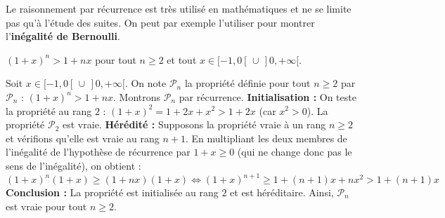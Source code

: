 	\begin{nosummary}
		Le raisonnement par récurrence est très utilisé en mathématiques et ne se limite pas qu'à l'étude des suites. On peut par exemple l'utiliser pour montrer l'\textbf{inégalité de Bernoulli}.

		\begin{formula}
			$(1 + x)^n > 1 + nx$ pour tout $n \geq 2$ et tout $x \in [-1, 0[ \, \cup \, ]0, +\infty[$.
		\end{formula}

		\begin{demonstration}
			Soit $x \in [-1, 0[ \, \cup \, ]0, +\infty[$. On note $\mathcal{P}_n$ la propriété définie pour tout $n \geq 2$ par $\mathcal{P}_n$ : $(1+x)^n > 1+nx$. Montrons $\mathcal{P}_n$ par récurrence.
			\newpar
			\textbf{Initialisation :} On teste la propriété au rang $2$ : $(1+x)^2 = 1 + 2x + x^2 > 1 + 2x$ (car $x^2 > 0$). La propriété $\mathcal{P}_2$ est vraie.
			\newpar
			\textbf{Hérédité :} Supposons la propriété vraie à un rang $n \geq 2$ et vérifions qu'elle est vraie au rang $n+1$.
			\newpar
			En multipliant les deux membres de l'inégalité de l'hypothèse de récurrence par $1+x \geq 0$ (qui ne change donc pas le sens de l'inégalité), on obtient :
			\[ (1+x)^n (1+x) \geq (1+nx)(1+x) \iff (1+x)^{n+1} \geq 1 + (n+1)x + nx^2 > 1 + (n+1)x \]
			\textbf{Conclusion :}
			\newpar
			La propriété est initialisée au rang $2$ et est héréditaire. Ainsi, $\mathcal{P}_n$ est vraie pour tout $n \geq 2$.
		\end{demonstration}
	\end{nosummary}

